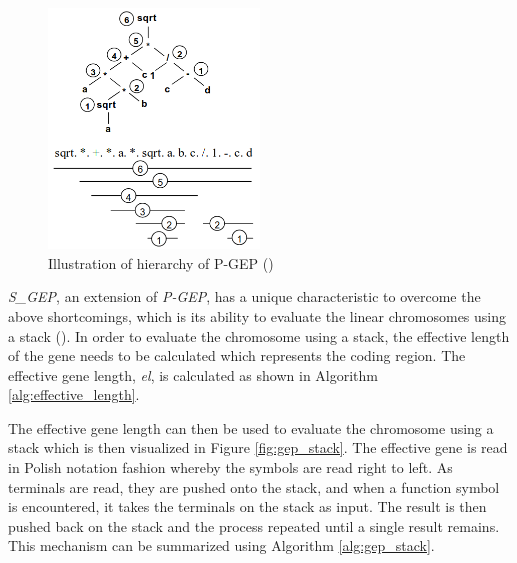 \parbreak
\begin{figure}[H] %
        \centering %
        \includegraphics[width=0.5\textwidth]{Figures/chapter_gep/p_gep.png} %
        \caption{Illustration of hierarchy of P-GEP (\cite{li2005prefix})}
        \label{fig:p_gep} %
\end{figure}

\noindent \textit{S\_GEP}, an extension of \textit{P-GEP}, has a unique characteristic to overcome the above shortcomings, which is its ability to evaluate the linear chromosomes using a stack (\cite{peng2014improved}). In order to evaluate the chromosome using a stack, the effective length of the gene needs to be calculated which represents the coding region. The effective gene length, \textit{el}, is calculated as shown in Algorithm \ref{alg:effective_length}.

\parbreak\noindent The effective gene length can then be used to evaluate the chromosome using a stack which is then visualized in Figure \ref{fig:gep_stack}. The effective gene is read in Polish notation fashion whereby the symbols are read right to left. As terminals are read, they are pushed onto the stack, and when a function symbol is encountered, it takes the terminals on the stack as input. The result is then pushed back on the stack and the process repeated until a single result remains. This mechanism can be summarized using Algorithm \ref{alg:gep_stack}.

